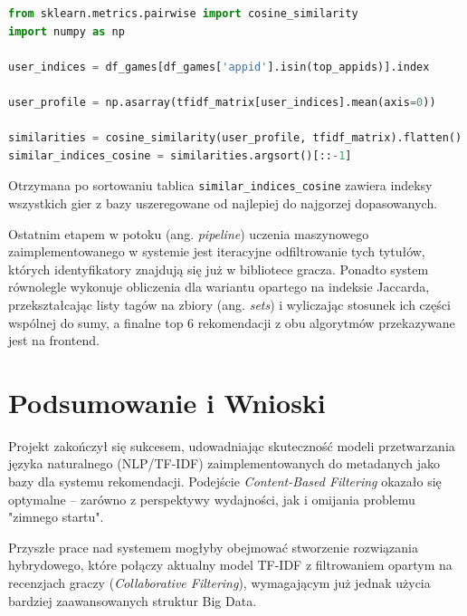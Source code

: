 \documentclass[12pt,a4paper]{article}
\begin{document}
\begin{lstlisting}[language=Python, caption=Budowa profilu użytkownika i obliczenie podobieństwa, label=lst:cosine]
from sklearn.metrics.pairwise import cosine_similarity
import numpy as np

user_indices = df_games[df_games['appid'].isin(top_appids)].index

user_profile = np.asarray(tfidf_matrix[user_indices].mean(axis=0))

similarities = cosine_similarity(user_profile, tfidf_matrix).flatten()
similar_indices_cosine = similarities.argsort()[::-1]
\end{lstlisting}

Otrzymana po sortowaniu tablica \texttt{similar\_indices\_cosine} zawiera indeksy wszystkich gier z bazy uszeregowane od najlepiej do najgorzej dopasowanych. 

Ostatnim etapem w potoku (ang. \textit{pipeline}) uczenia maszynowego zaimplementowanego w systemie jest iteracyjne odfiltrowanie tych tytułów, których identyfikatory znajdują się już w bibliotece gracza. Ponadto system równolegle wykonuje obliczenia dla wariantu opartego na indeksie Jaccarda, przekształcając listy tagów na zbiory (ang. \textit{sets}) i wyliczając stosunek ich części wspólnej do sumy, a finalne top 6 rekomendacji z obu algorytmów przekazywane jest na frontend.

\section{Podsumowanie i Wnioski}
Projekt zakończył się sukcesem, udowadniając skuteczność modeli przetwarzania języka naturalnego (NLP/TF-IDF) zaimplementowanych do metadanych jako bazy dla systemu rekomendacji. Podejście \textit{Content-Based Filtering} okazało się optymalne – zarówno z perspektywy wydajności, jak i omijania problemu "zimnego startu".

Przyszłe prace nad systemem mogłyby obejmować stworzenie rozwiązania hybrydowego, które połączy aktualny model TF-IDF z filtrowaniem opartym na recenzjach graczy (\textit{Collaborative Filtering}), wymagającym już jednak użycia bardziej zaawansowanych struktur Big Data.
\end{document}
